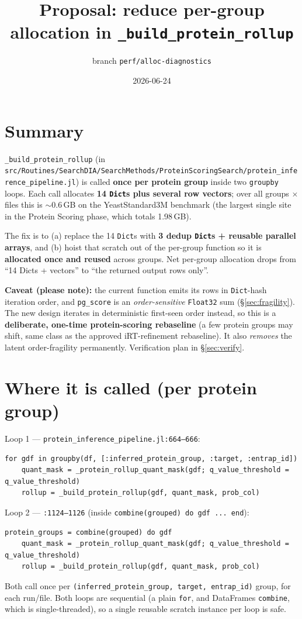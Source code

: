 \documentclass[11pt]{article}
\title{Proposal: reduce per-group allocation in \texttt{\_build\_protein\_rollup}}
\author{branch \texttt{perf/alloc-diagnostics}}
\date{2026-06-24}
\begin{document}
\maketitle

\section{Summary}
\texttt{\_build\_protein\_rollup} (in
\texttt{src/Routines/SearchDIA/SearchMethods/ProteinScoringSearch/protein\_inference\_pipeline.jl})
is called \textbf{once per protein group} inside two \texttt{groupby} loops. Each
call allocates \textbf{14 \texttt{Dict}s plus several row vectors}; over all groups
$\times$ files this is $\sim$0.6\,GB on the YeastStandard3M benchmark (the largest
single site in the Protein Scoring phase, which totals 1.98\,GB).

The fix is to (a) replace the 14 \texttt{Dict}s with \textbf{3 dedup \texttt{Dict}s +
reusable parallel arrays}, and (b) hoist that scratch out of the per-group function
so it is \textbf{allocated once and reused} across groups. Net per-group allocation
drops from ``14 Dicts + vectors'' to ``the returned output rows only''.

\textbf{Caveat (please note):} the current function emits its rows in
\texttt{Dict}-hash iteration order, and \texttt{pg\_score} is an
\emph{order-sensitive} \texttt{Float32} sum (\S\ref{sec:fragility}). The new design
iterates in deterministic first-seen order instead, so this is a \textbf{deliberate,
one-time protein-scoring rebaseline} (a few protein groups may shift, same class as
the approved iRT-refinement rebaseline). It also \emph{removes} the latent
order-fragility permanently. Verification plan in \S\ref{sec:verify}.

\section{Where it is called (per protein group)}
Loop 1 --- \texttt{protein\_inference\_pipeline.jl:664--666}:
\begin{lstlisting}[firstnumber=664]
for gdf in groupby(df, [:inferred_protein_group, :target, :entrap_id])
    quant_mask = _protein_rollup_quant_mask(gdf; q_value_threshold = q_value_threshold)
    rollup = _build_protein_rollup(gdf, quant_mask, prob_col)
\end{lstlisting}
Loop 2 --- \texttt{:1124--1126} (inside \texttt{combine(grouped) do gdf ... end}):
\begin{lstlisting}[firstnumber=1124]
protein_groups = combine(grouped) do gdf
    quant_mask = _protein_rollup_quant_mask(gdf; q_value_threshold = q_value_threshold)
    rollup = _build_protein_rollup(gdf, quant_mask, prob_col)
\end{lstlisting}
Both call once per \texttt{(inferred\_protein\_group, target, entrap\_id)} group, for
each run/file. Both loops are sequential (a plain \texttt{for}, and DataFrames
\texttt{combine}, which is single-threaded), so a single reusable scratch instance
per loop is safe.
\end{document}
